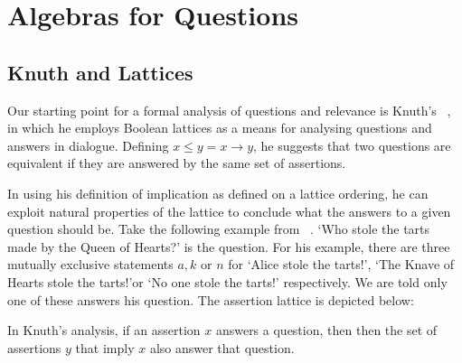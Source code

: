 \documentclass[11pt,a4paper]{article}
\theoremstyle{definition}
\begin{document}
\iffalse
\section{Algebras for Questions}
\subsection{Knuth and Lattices}
Our starting point for a formal analysis of questions and relevance is Knuth's ~\cite{knuth2005lattice}, in which he employs Boolean lattices as a means for analysing questions and answers in dialogue. Defining $x \le y = x \rightarrow y$, he suggests that two questions are equivalent if they are answered by the
same set of assertions. \par In using his definition of implication as defined on a lattice ordering, he can exploit natural properties of the lattice to conclude what the answers to a given question should be. Take the following example from ~\cite{knuth2005lattice}. `Who stole the tarts made by the Queen of Hearts?' is the question. For his example, there are three mutually exclusive statements $a, k$ or $n$ for `Alice stole the tarts!', `The Knave of Hearts stole the tarts!'or `No one stole the tarts!' respectively. We are told only one of these answers his question. The assertion lattice is depicted below:


In Knuth's analysis, if an assertion $x$ answers a question, then then the set of assertions $y$ that imply $x$ also answer that question. 
\end{document}
